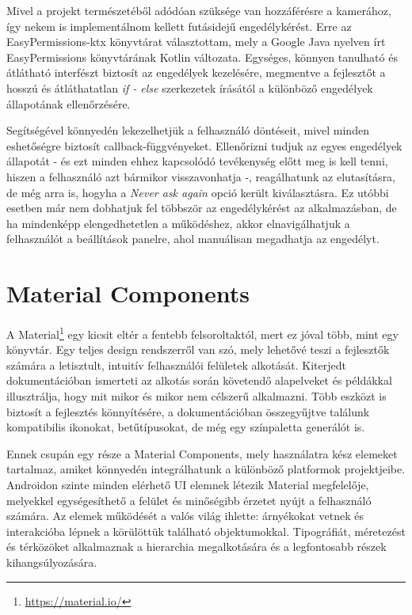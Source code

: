 Mivel a projekt természetéből adódóan szüksége van hozzáférésre a kamerához, így nekem is implementálnom kellett futásidejű engedélykérést. Erre az EasyPermissions-ktx könyvtárat választottam, mely a Google Java nyelven írt EasyPermissions könyvtárának Kotlin változata. Egységes, könnyen tanulható és átlátható interfészt biztosít az engedélyek kezelésére, megmentve a fejlesztőt a hosszú és átláthatatlan \emph{if - else} szerkezetek írásától a különböző engedélyek állapotának ellenőrzésére.

Segítségével könnyedén lekezelhetjük a felhasználó döntéseit, mivel minden eshetőségre biztosít callback-függvényeket. Ellenőrizni tudjuk az egyes engedélyek állapotát - és ezt minden ehhez kapcsolódó tevékenység előtt meg is kell tenni, hiszen a felhasználó azt bármikor visszavonhatja -, reagálhatunk az elutasításra, de még arra is, hogyha a \emph{Never ask again} opció került kiválasztásra. Ez utóbbi esetben már nem dobhatjuk fel többször az engedélykérést az alkalmazásban, de ha mindenképp elengedhetetlen a működéshez, akkor elnavigálhatjuk a felhasználót a beállítások panelre, ahol manuálisan megadhatja az engedélyt.

\section{Material Components}

A Material\footnote{\url{https://material.io/}} egy kicsit eltér a fentebb felsoroltaktól, mert ez jóval több, mint egy könyvtár. Egy teljes design rendszerről van szó, mely lehetővé teszi a fejlesztők számára a letisztult, intuitív felhasználói felületek alkotását. Kiterjedt dokumentációban ismerteti az alkotás során követendő alapelveket és példákkal illusztrálja, hogy mit mikor és mikor nem célszerű alkalmazni. Több eszközt is biztosít a fejlesztés könnyítésére, a dokumentációban összegyűjtve találunk kompatibilis ikonokat, betűtípusokat, de még egy színpaletta generálót is.

Ennek csupán egy része a Material Components, mely használatra kész elemeket tartalmaz, amiket könnyedén integrálhatunk a különböző platformok projektjeibe. Androidon szinte minden elérhető UI elemnek létezik Material megfelelője, melyekkel egységesíthető a felület és minőségibb érzetet nyújt a felhasználó számára. Az elemek működését a valós világ ihlette: árnyékokat vetnek és interakcióba lépnek a körülöttük található objektumokkal. Tipográfiát, méretezést és térközöket alkalmaznak a hierarchia megalkotására és a legfontosabb részek kihangsúlyozására.

